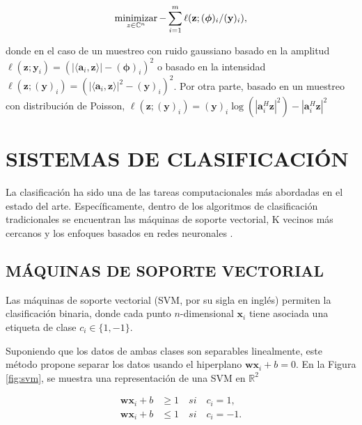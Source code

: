 \begin{itemize}
    \begin{equation}
        \operatorname*{minimizar}_{z \in \mathbb{C}^{n}} -\sum_{i=1}^{m} \ell(\mathbf{z};(\boldsymbol{\phi})_i/(\mathbf{y})_i),
    \end{equation}
    
    donde en el caso de un muestreo con ruido gaussiano basado en la amplitud $\ell(\mathbf{z};\mathbf{y}_i) = (\vert \langle \mathbf{a}_i,\mathbf{z}\rangle \vert - (\boldsymbol{\phi})_i)^2$ o basado en la intensidad  $\ell(\mathbf{z};(\mathbf{y})_i) = (\vert \langle \mathbf{a}_i,\mathbf{z}\rangle \vert^2 - (\mathbf{y})_i)^2$. Por otra parte, basado en un muestreo con distribución de Poisson, $\ell(\mathbf{z};(\mathbf{y})_i) = {(\mathbf{y})_i \log(|\mathbf{a}_i^H \mathbf{z}|^2) -|\mathbf{a}_i^H \mathbf{z}|^2 }$ 
\end{itemize}





\chapter{SISTEMAS DE CLASIFICACIÓN}

La clasificación ha sido una de las tareas computacionales más abordadas en el estado del arte. Específicamente, dentro de los algoritmos de clasificación tradicionales se encuentran las máquinas de soporte vectorial, K vecinos más cercanos  y los enfoques basados en redes neuronales .
\section{MÁQUINAS DE SOPORTE VECTORIAL}
Las máquinas de soporte vectorial (SVM, por su sigla en inglés)  permiten la clasificación binaria, donde cada punto $n$-dimensional $\mathbf{x}_i$ tiene asociada una etiqueta de clase $c_i \in \{1,-1\}$.

Suponiendo que los datos de ambas clases son separables linealmente, este método propone separar los datos usando el hiperplano $\mathbf{w}\mathbf{x}_i + b = 0$. En la Figura \ref{fig:svm}, se muestra una representación de una SVM en $\mathbb{R}^2$

\begin{equation}
    \begin{split}
        \mathbf{w}\mathbf{x}_i + b &\geq 1 \quad si \quad c_i=1, \\
        \mathbf{w}\mathbf{x}_i + b &\leq 1 \quad si \quad c_i=-1.
    \end{split}
\end{equation}

